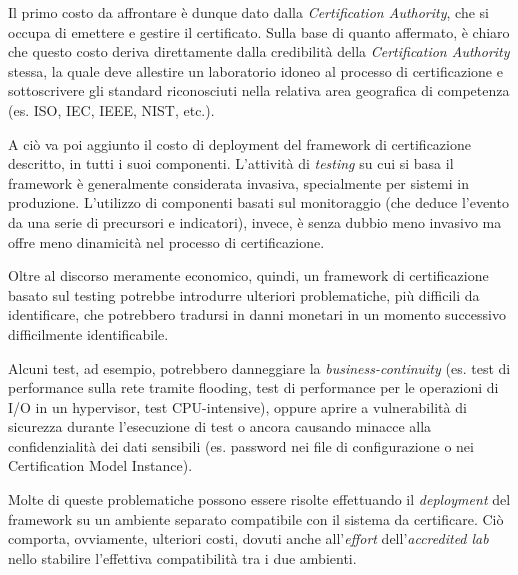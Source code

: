\documentclass[../main.tex]{subfiles}
\begin{document}
Il primo costo da affrontare è dunque dato dalla \textit{Certification Authority}, che si occupa di emettere e gestire il certificato.
Sulla base di quanto affermato, è chiaro che questo costo deriva direttamente dalla credibilità della \textit{Certification Authority} stessa, la quale deve allestire un laboratorio idoneo al processo di certificazione e sottoscrivere gli standard riconosciuti nella relativa area geografica di competenza (es. ISO, IEC, IEEE, NIST, etc.).

A ciò va poi aggiunto il costo di deployment del framework di certificazione descritto, in tutti i suoi componenti.
L'attività di \textit{testing} su cui si basa il framework è generalmente considerata invasiva, specialmente per sistemi in produzione.
L'utilizzo di componenti basati sul monitoraggio (che deduce l'evento da una serie di precursori e indicatori), invece, è senza dubbio meno invasivo ma offre meno dinamicità nel processo di certificazione.

Oltre al discorso meramente economico, quindi, un framework di certificazione basato sul testing potrebbe introdurre ulteriori problematiche, più difficili da identificare, che potrebbero tradursi in danni monetari in un momento successivo difficilmente identificabile.

Alcuni test, ad esempio, potrebbero danneggiare la \textit{business-continuity} (es. test di performance sulla rete tramite flooding, test di performance per le operazioni di I/O in un hypervisor, test CPU-intensive), oppure aprire a vulnerabilità di sicurezza durante l'esecuzione di test o ancora causando minacce alla confidenzialità dei dati sensibili (es. password nei file di configurazione o nei Certification Model Instance).

Molte di queste problematiche possono essere risolte effettuando il \textit{deployment} del framework su un ambiente separato compatibile con il sistema da certificare.
Ciò comporta, ovviamente, ulteriori costi, dovuti anche all'\textit{effort} dell'\textit{accredited lab} nello stabilire l'effettiva compatibilità tra i due ambienti. 
\end{document}
